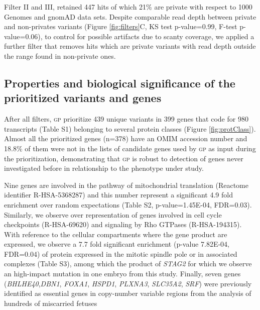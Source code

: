 \documentclass[fleqn,10pt]{wlscirep}
\newcommand{\gp}[]{\textsc{gp }}
\begin{document}
Filter II and III, retained 447 hits of which 21\% are private with respect to 1000 Genomes and gnomAD data sets. Despite comparable read depth between private and non-privates variants (Figure \ref{fig:filters}C, KS test p-value=0.99, F-test p-value=0.06), to control for possible artifacts due to scanty coverage, we applied a further filter that removes hits which are private variants with read depth outside the range found in non-private ones.  

\subsection*{Properties and biological significance of the prioritized variants and genes} 

After all filters, \gp prioritize 439 unique variants in 399 genes that code for 980 transcripts (Table S1) belonging to several protein classes (Figure \ref{fig:protClass}). Almost all the prioritized genes (n=378) have an OMIM accession number and 18.8\% of them were not in the lists of candidate genes used by \gp as input during the prioritization, demonstrating that \gp is robust to detection of genes never investigated before in relationship to the phenotype under study. 

Nine genes are involved in the pathway of mitochondrial translation (Reactome identifier R-HSA-5368287) and this number represent a significant 4.9 fold enrichment over random expectations (Table S2, p-value=1.45E-04, FDR=0.03). Similarly, we observe over representation of genes involved in cell cycle checkpoints (R-HSA-69620) and signaling by Rho GTPases (R-HSA-194315). With reference to the cellular compartments where the gene product are expressed, we observe a 7.7 fold significant enrichment (p-value 7.82E-04, FDR=0.04) of protein expressed in the mitotic spindle pole or in associated complexes (Table S3), among which the product of \textit{STAG2} for which we observe an high-impact mutation in one embryo from this study. Finally, seven genes (\textit{BHLHE40},\textit{DBN1}, \textit{FOXA1}, \textit{HSPD1}, \textit{PLXNA3}, \textit{SLC35A2}, \textit{SRF}) were previously identified as essential genes in copy-number variable regions from the analysis of hundreds of miscarried fetuses \cite{chen2017characterization} %
\end{document}
